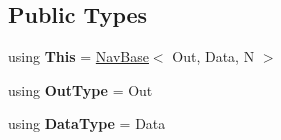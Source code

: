 \subsection*{Public Types}
\begin{DoxyCompactItemize}
\item 
\mbox{\label{classNavBase_a27cf431707047e81070935913b681ad5}} 
using {\bfseries This} = \hyperlink{classNavBase}{Nav\+Base}$<$ Out, Data, N $>$
\item 
\mbox{\label{classNavBase_a704ee2d1cc84a819d9d0a3874546c430}} 
using {\bfseries Out\+Type} = Out
\item 
\mbox{\label{classNavBase_af91267dbc52cb50da22a2c1e21991216}} 
using {\bfseries Data\+Type} = Data
\end{DoxyCompactItemize}
